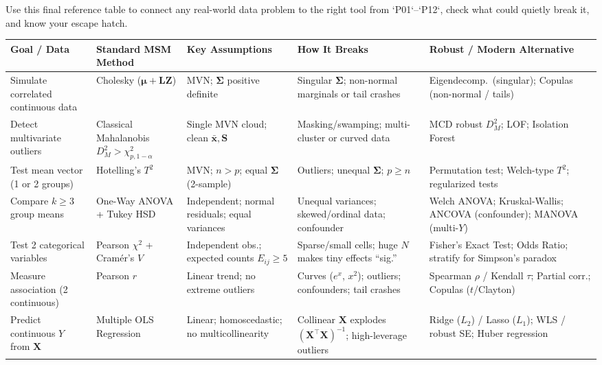 \documentclass[11pt, a4paper]{article}
\begin{document}
Use this final reference table to connect any real-world data problem to the right tool from `P01`--`P12`, check what could quietly break it, and know your escape hatch.

\begin{table}[h!]
\centering
\small
\begin{tabularx}{\textwidth}{>{\raggedright\arraybackslash}p{2.7cm} >{\raggedright\arraybackslash}p{2.7cm} >{\raggedright\arraybackslash}p{3.0cm} >{\raggedright\arraybackslash}p{3.1cm} >{\raggedright\arraybackslash}X}
\toprule
\textbf{Goal / Data} & \textbf{Standard MSM Method} & \textbf{Key Assumptions} & \textbf{How It Breaks} & \textbf{Robust / Modern Alternative} \\
\midrule
Simulate correlated continuous data & Cholesky ($\boldsymbol{\mu} + \mathbf{L}\mathbf{Z}$) & MVN; $\boldsymbol{\Sigma}$ positive definite & Singular $\boldsymbol{\Sigma}$; non-normal marginals or tail crashes & Eigendecomp.\ (singular); Copulas (non-normal / tails) \\
Detect multivariate outliers & Classical Mahalanobis $D_M^2 > \chi_{p, 1-\alpha}^2$ & Single MVN cloud; clean $\bar{\mathbf{x}}, \mathbf{S}$ & Masking/swamping; multi-cluster or curved data & MCD robust $D_M^2$; LOF; Isolation Forest \\
Test mean vector (1 or 2 groups) & Hotelling's $T^2$ & MVN; $n > p$; equal $\boldsymbol{\Sigma}$ (2-sample) & Outliers; unequal $\boldsymbol{\Sigma}$; $p \ge n$ & Permutation test; Welch-type $T^2$; regularized tests \\
Compare $k \ge 3$ group means & One-Way ANOVA + Tukey HSD & Independent; normal residuals; equal variances & Unequal variances; skewed/ordinal data; confounder & Welch ANOVA; Kruskal-Wallis; ANCOVA (confounder); MANOVA (multi-$Y$) \\
Test 2 categorical variables & Pearson $\chi^2$ + Cramér's $V$ & Independent obs.; expected counts $E_{ij} \ge 5$ & Sparse/small cells; huge $N$ makes tiny effects ``sig.'' & Fisher's Exact Test; Odds Ratio; stratify for Simpson's paradox \\
Measure association (2 continuous) & Pearson $r$ & Linear trend; no extreme outliers & Curves ($e^x$, $x^2$); outliers; confounders; tail crashes & Spearman $\rho$ / Kendall $\tau$; Partial corr.; Copulas ($t$/Clayton) \\
Predict continuous $Y$ from $\mathbf{X}$ & Multiple OLS Regression & Linear; homoscedastic; no multicollinearity & Collinear $\mathbf{X}$ explodes $(\mathbf{X}^\top\mathbf{X})^{-1}$; high-leverage outliers & Ridge ($L_2$) / Lasso ($L_1$); WLS / robust SE; Huber regression \\

\end{tabularx}
\end{table}
\end{document}
